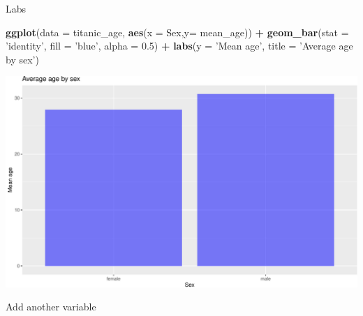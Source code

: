 \documentclass[
]{book}
\newenvironment{Shaded}{\begin{snugshade}}{\end{snugshade}}
\newcommand{\DataTypeTok}[1]{\textcolor[rgb]{0.13,0.29,0.53}{#1}}
\newcommand{\DecValTok}[1]{\textcolor[rgb]{0.00,0.00,0.81}{#1}}
\newcommand{\FloatTok}[1]{\textcolor[rgb]{0.00,0.00,0.81}{#1}}
\newcommand{\KeywordTok}[1]{\textcolor[rgb]{0.13,0.29,0.53}{\textbf{#1}}}
\newcommand{\NormalTok}[1]{#1}
\newcommand{\OperatorTok}[1]{\textcolor[rgb]{0.81,0.36,0.00}{\textbf{#1}}}
\newcommand{\OtherTok}[1]{\textcolor[rgb]{0.56,0.35,0.01}{#1}}
\newcommand{\StringTok}[1]{\textcolor[rgb]{0.31,0.60,0.02}{#1}}
\begin{document}
Labs

\begin{Shaded}
\begin{Highlighting}[]

\KeywordTok{ggplot}\NormalTok{(}\DataTypeTok{data =}\NormalTok{ titanic_age, }\KeywordTok{aes}\NormalTok{(}\DataTypeTok{x =}\NormalTok{ Sex,}\DataTypeTok{y=}\NormalTok{ mean_age)) }\OperatorTok{+}\StringTok{ }\KeywordTok{geom_bar}\NormalTok{(}\DataTypeTok{stat =} \StringTok{'identity'}\NormalTok{, }\DataTypeTok{fill =} \StringTok{'blue'}\NormalTok{, }\DataTypeTok{alpha =} \FloatTok{0.5}\NormalTok{) }\OperatorTok{+}\StringTok{ }\KeywordTok{labs}\NormalTok{(}\DataTypeTok{y =} \StringTok{'Mean age'}\NormalTok{, }\DataTypeTok{title =} \StringTok{'Average age by sex'}\NormalTok{)}
\end{Highlighting}
\end{Shaded}

\includegraphics{figures/unnamed-chunk-144-1.pdf}

Add another variable

\begin{Shaded}
\end{Shaded}
\end{document}
